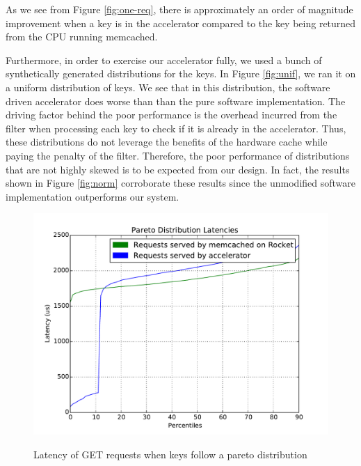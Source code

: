 As we see from Figure \ref{fig:one-req}, there is approximately an order of magnitude
improvement when a key is in the accelerator compared to the key being returned
from the CPU running memcached.

Furthermore, in order to exercise our accelerator fully, we used a bunch of
synthetically generated distributions for the keys. In Figure \ref{fig:unif},
we ran it on a uniform distribution of keys. We see that in this distribution,
the software driven accelerator does worse than than the pure software
implementation. The driving factor behind the poor performance is the overhead
incurred from the filter when processing each key to check if it is already in
the accelerator. Thus, these distributions do not leverage the benefits of the
hardware cache while paying the penalty of the filter. Therefore, the poor
performance of distributions that are not highly skewed is to be expected from
our design. In fact, the results shown in Figure \ref{fig:norm} corroborate
these results since the unmodified software implementation outperforms our
system.

\begin{figure}[t]
\begin{center}
\label{fig:pareto}
\includegraphics[width=\linewidth]{pareto.pdf}
\caption{Latency of GET requests when keys follow a pareto distribution}
\end{center}
\end{figure}

